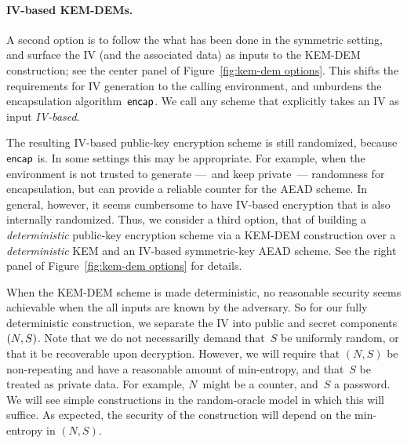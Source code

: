\paragraph{IV-based KEM-DEMs. }
A second option is to follow the what has been done in the symmetric setting, and surface the IV (and the associated data) as inputs to the KEM-DEM construction; see the center panel of Figure~\ref{fig:kem-dem options}.  
This shifts the requirements for IV generation to the calling environment, and unburdens the encapsulation algorithm~$\mathsf{encap}$.  We call any scheme that explicitly takes an IV as input \emph{IV-based}.  

The resulting IV-based public-key encryption scheme is still randomized, because $\mathsf{encap}$ is.  In some settings this may be appropriate.  For example, when the environment is not trusted to generate ---~and keep private~--- randomness for encapsulation, but can provide a reliable counter for the AEAD scheme.    In general, however, it seems cumbersome to have IV-based encryption that is also internally randomized.  
Thus, we consider a third option, that of building a \emph{deterministic} public-key encryption scheme via a KEM-DEM construction over a \emph{deterministic} KEM and an IV-based symmetric-key AEAD scheme.  See the right panel of Figure~\ref{fig:kem-dem options} for details.  

When the KEM-DEM scheme is made deterministic, no reasonable security seems achievable when the all inputs are known by the adversary.  So for our fully deterministic construction, we separate the IV into public and secret components $(N,S)$.   
Note that we do not necessarilly demand that~$S$ be uniformly random, or that it be recoverable upon decryption.  However, we will require that $(N,S)$ be non-repeating and have a reasonable amount of min-entropy, and that~$S$ be treated as private data.  For example, $N$~might be a counter, and~$S$ a password.  We will see simple constructions in the random-oracle model in which this will suffice. As expected, the security of the construction will depend on the min-entropy in $(N,S)$. 

